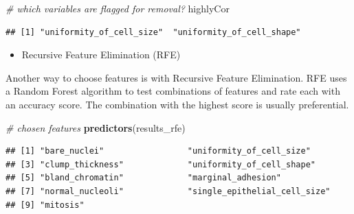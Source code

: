 \documentclass[]{article}
\newenvironment{Shaded}{\begin{snugshade}}{\end{snugshade}}
\newcommand{\KeywordTok}[1]{\textcolor[rgb]{0.13,0.29,0.53}{\textbf{{#1}}}}
\newcommand{\DecValTok}[1]{\textcolor[rgb]{0.00,0.00,0.81}{{#1}}}
\newcommand{\StringTok}[1]{\textcolor[rgb]{0.31,0.60,0.02}{{#1}}}
\newcommand{\CommentTok}[1]{\textcolor[rgb]{0.56,0.35,0.01}{\textit{{#1}}}}
\newcommand{\NormalTok}[1]{{#1}}
\providecommand{\tightlist}{%
  \setlength{\itemsep}{0pt}\setlength{\parskip}{0pt}}
\begin{document}
\begin{Shaded}
\begin{Highlighting}[]
\CommentTok{# which variables are flagged for removal?}
\NormalTok{highlyCor}
\end{Highlighting}
\end{Shaded}

\begin{verbatim}
## [1] "uniformity_of_cell_size"  "uniformity_of_cell_shape"
\end{verbatim}

\begin{Shaded}
\end{Shaded}

\begin{itemize}
\tightlist
\item
  Recursive Feature Elimination (RFE)
\end{itemize}

Another way to choose features is with Recursive Feature Elimination.
RFE uses a Random Forest algorithm to test combinations of features and
rate each with an accuracy score. The combination with the highest score
is usually preferential.

\begin{Shaded}
\begin{Highlighting}[]
\CommentTok{# chosen features}
\KeywordTok{predictors}\NormalTok{(results_rfe)}
\end{Highlighting}
\end{Shaded}

\begin{verbatim}
## [1] "bare_nuclei"                 "uniformity_of_cell_size"    
## [3] "clump_thickness"             "uniformity_of_cell_shape"   
## [5] "bland_chromatin"             "marginal_adhesion"          
## [7] "normal_nucleoli"             "single_epithelial_cell_size"
## [9] "mitosis"
\end{verbatim}

\begin{Shaded}
\end{Shaded}
\end{document}
